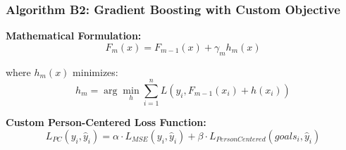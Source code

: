 \documentclass[12pt]{article}
\begin{document}
\subsubsection{Algorithm B2: Gradient Boosting with Custom Objective}

\textbf{Mathematical Formulation:}
\begin{equation}
F_m(x) = F_{m-1}(x) + \gamma_m h_m(x)
\end{equation}

where $h_m(x)$ minimizes:
\begin{equation}
h_m = \arg\min_h \sum_{i=1}^{n} L(y_i, F_{m-1}(x_i) + h(x_i))
\end{equation}

\textbf{Custom Person-Centered Loss Function:}
\begin{equation}
L_{PC}(y_i, \hat{y}_i) = \alpha \cdot L_{MSE}(y_i, \hat{y}_i) + \beta \cdot L_{PersonCentered}(goals_i, \hat{y}_i)
\end{equation}
\end{document}
